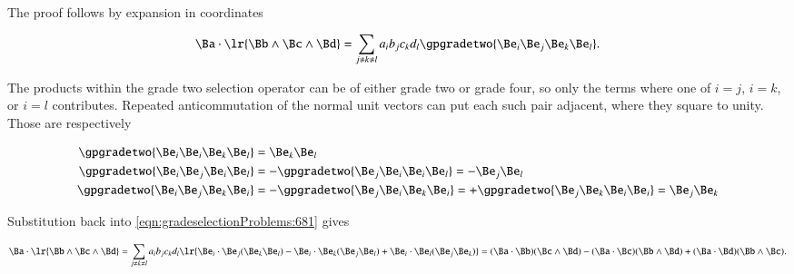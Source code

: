 %
%



The proof follows by expansion in coordinates

\begin{dmath}\label{eqn:vectorTrivectorDot:40}
\Ba \cdot \lr{ \Bb \wedge \Bc \wedge \Bd}
= \sum_{j \ne k \ne l} a_i b_j c_k d_l
\gpgradetwo{ \Be_i \Be_j \Be_k \Be_l }.
\end{dmath}

The products within the grade two selection operator can be of either grade two or grade four, so only the terms where one of
\( i = j \), \( i = k \), or \( i = l \) contributes.  Repeated anticommutation of the normal unit vectors can put each such pair adjacent, where they square to unity.  Those are respectively

\begin{dmath}\label{eqn:vectorTrivectorDot:60}
\begin{aligned}
\gpgradetwo{ \Be_i \Be_i \Be_k \Be_l } &= \Be_k \Be_l  \\
\gpgradetwo{ \Be_i \Be_j \Be_i \Be_l } &= -\gpgradetwo{ \Be_j \Be_i \Be_i \Be_l } = - \Be_j \Be_l \\
\gpgradetwo{ \Be_i \Be_j \Be_k \Be_i } &= -\gpgradetwo{ \Be_j \Be_i \Be_k \Be_i } = +\gpgradetwo{ \Be_j \Be_k \Be_i \Be_i } = \Be_j \Be_k
\end{aligned}
\end{dmath}

Substitution back into \cref{eqn:gradeselectionProblems:681} gives

\begin{dmath}\label{eqn:vectorTrivectorDot:80}
\Ba \cdot \lr{ \Bb \wedge \Bc \wedge \Bd}
= \sum_{j \ne k \ne l} a_i b_j c_k d_l
\lr{
\Be_i \cdot \Be_j (\Be_k \Be_l)
-
\Be_i \cdot \Be_k (\Be_j \Be_l)
+
\Be_i \cdot \Be_l (\Be_j \Be_k)
}
=
( \Ba \cdot \Bb ) (\Bc \wedge \Bd)
-( \Ba \cdot \Bc ) (\Bb \wedge \Bd)
+( \Ba \cdot \Bd ) (\Bb \wedge \Bc).
\end{dmath}

